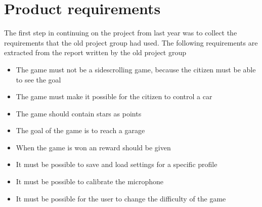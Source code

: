 \section{Product requirements}

The first step in continuing on the project from last year was to collect the requirements that the old project group had used.
The following requirements are extracted from the report written by the old project group \cite{oldcars}

\begin{itemize}
\item The game must not be a sidescrolling game, because the citizen must be able to see the goal
\item The game must make it possible for the citizen to control a car
\item The game should contain stars as points
\item The goal of the game is to reach a garage
\item When the game is won an reward should be given
\item It must be possible to save and load settings for a specific profile
\item It must be possible to calibrate the microphone 
\item It must be possible for the user to change the difficulty of the game  
\end{itemize}